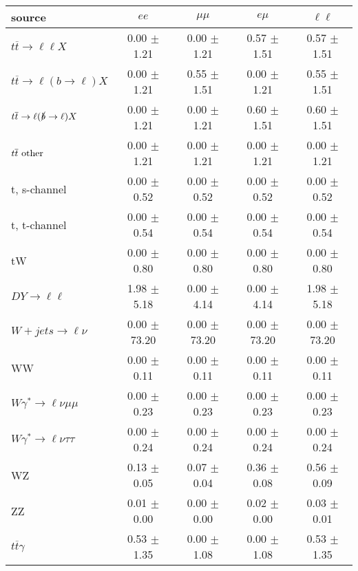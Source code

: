 \begin{tabular}{l|cccc} \hline\hline
source & $ee$ & $\mu\mu$ & $e\mu$ & $\ell\ell $ \\
\hline
$t\overline{t} \rightarrow \ell \ell X$ &  0.00 $\pm$  1.21 &  0.00 $\pm$  1.21 &  0.57 $\pm$  1.51 &  0.57 $\pm$  1.51 \\
$t\overline{t} \rightarrow \ell (b \rightarrow \ell) X$ &  0.00 $\pm$  1.21 &  0.55 $\pm$  1.51 &  0.00 $\pm$  1.21 &  0.55 $\pm$  1.51 \\
$t\overline{t} \rightarrow \ell (\slashed b \rightarrow \ell) X$ &  0.00 $\pm$  1.21 &  0.00 $\pm$  1.21 &  0.60 $\pm$  1.51 &  0.60 $\pm$  1.51 \\
        $t\overline{t}\ \rm{other}$ &  0.00 $\pm$  1.21 &  0.00 $\pm$  1.21 &  0.00 $\pm$  1.21 &  0.00 $\pm$  1.21 \\
\hline
                       t, s-channel &  0.00 $\pm$  0.52 &  0.00 $\pm$  0.52 &  0.00 $\pm$  0.52 &  0.00 $\pm$  0.52 \\
                       t, t-channel &  0.00 $\pm$  0.54 &  0.00 $\pm$  0.54 &  0.00 $\pm$  0.54 &  0.00 $\pm$  0.54 \\
                                 tW &  0.00 $\pm$  0.80 &  0.00 $\pm$  0.80 &  0.00 $\pm$  0.80 &  0.00 $\pm$  0.80 \\
\hline
         $DY \rightarrow \ell \ell$ &  1.98 $\pm$  5.18 &  0.00 $\pm$  4.14 &  0.00 $\pm$  4.14 &  1.98 $\pm$  5.18 \\
      $W+jets \rightarrow \ell \nu$ &  0.00 $\pm$ 73.20 &  0.00 $\pm$ 73.20 &  0.00 $\pm$ 73.20 &  0.00 $\pm$ 73.20 \\
                                 WW &  0.00 $\pm$  0.11 &  0.00 $\pm$  0.11 &  0.00 $\pm$  0.11 &  0.00 $\pm$  0.11 \\
\hline
$W\gamma^{*} \rightarrow \ell \nu \mu\mu$ &  0.00 $\pm$  0.23 &  0.00 $\pm$  0.23 &  0.00 $\pm$  0.23 &  0.00 $\pm$  0.23 \\
$W\gamma^{*} \rightarrow \ell \nu \tau\tau$ &  0.00 $\pm$  0.24 &  0.00 $\pm$  0.24 &  0.00 $\pm$  0.24 &  0.00 $\pm$  0.24 \\
                                 WZ &  0.13 $\pm$  0.05 &  0.07 $\pm$  0.04 &  0.36 $\pm$  0.08 &  0.56 $\pm$  0.09 \\
                                 ZZ &  0.01 $\pm$  0.00 &  0.00 $\pm$  0.00 &  0.02 $\pm$  0.00 &  0.03 $\pm$  0.01 \\
\hline
              $t\overline{t}\gamma$ &  0.53 $\pm$  1.35 &  0.00 $\pm$  1.08 &  0.00 $\pm$  1.08 &  0.53 $\pm$  1.35 \\

\end{tabular}
